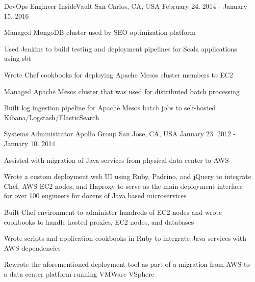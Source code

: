 \begin{cventries}
  \cventry
    {DevOps Engineer} %
    {InsideVault} %
    {San Carlos, CA, USA} %
    {February 24. 2014 - January 15. 2016} %
    {
      \begin{cvitems}
        \item {Managed MongoDB cluster used by SEO optimization platform}
        \item {Used Jenkins to build testing and deployment pipelines for Scala applications using sbt}
        \item {Wrote Chef cookbooks for deploying Apache Mesos cluster members to EC2}
        \item {Managed Apache Mesos cluster that was used for distributed batch processing}
        \item {Built log ingestion pipeline for Apache Mesos batch jobs to self-hosted Kibana/Logstash/ElasticSearch}
      \end{cvitems}
    }
  \cventry
    {Systems Administrator} %
    {Apollo Group} %
    {San Jose, CA, USA} %
    {January 23. 2012 - January 10. 2014} %
    {
      \begin{cvitems} %
        \item {Assisted with migration of Java services from physical data center to AWS}
        \item {Wrote a custom deployment web UI using Ruby, Padrino, and jQuery to integrate Chef, AWS EC2 nodes, and Haproxy to serve as the main deployment interface for over 100 engineers for dozens of Java based microservices}
        \item {Built Chef environment to administer hundreds of EC2 nodes and wrote cookbooks to handle hosted proxies, EC2 nodes, and databases}
        \item {Wrote scripts and application cookbooks in Ruby to integrate Java services with AWS dependencies}
        \item {Rewrote the aforementioned deployment tool as part of a migration from AWS to a data center platform running VMWare VSphere}
      \end{cvitems}
    }
\end{cventries}
